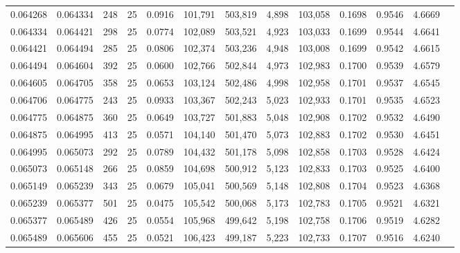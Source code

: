 \begin{tabular}{rrrrrrrrrrrrr}
0.064268 & 0.064334 &   248 &  25 &                                     0.0916 & 101,791 & 503,819 &   4,898 & 103,058 & 0.1698 & 0.9546 & 4.6669 \\
0.064334 & 0.064421 &   298 &  25 &                                     0.0774 & 102,089 & 503,521 &   4,923 & 103,033 & 0.1699 & 0.9544 & 4.6641 \\
0.064421 & 0.064494 &   285 &  25 &                                     0.0806 & 102,374 & 503,236 &   4,948 & 103,008 & 0.1699 & 0.9542 & 4.6615 \\
0.064494 & 0.064604 &   392 &  25 &                                     0.0600 & 102,766 & 502,844 &   4,973 & 102,983 & 0.1700 & 0.9539 & 4.6579 \\
0.064605 & 0.064705 &   358 &  25 &                                     0.0653 & 103,124 & 502,486 &   4,998 & 102,958 & 0.1701 & 0.9537 & 4.6545 \\
0.064706 & 0.064775 &   243 &  25 &                                     0.0933 & 103,367 & 502,243 &   5,023 & 102,933 & 0.1701 & 0.9535 & 4.6523 \\
0.064775 & 0.064875 &   360 &  25 &                                     0.0649 & 103,727 & 501,883 &   5,048 & 102,908 & 0.1702 & 0.9532 & 4.6490 \\
0.064875 & 0.064995 &   413 &  25 &                                     0.0571 & 104,140 & 501,470 &   5,073 & 102,883 & 0.1702 & 0.9530 & 4.6451 \\
0.064995 & 0.065073 &   292 &  25 &                                     0.0789 & 104,432 & 501,178 &   5,098 & 102,858 & 0.1703 & 0.9528 & 4.6424 \\
0.065073 & 0.065148 &   266 &  25 &                                     0.0859 & 104,698 & 500,912 &   5,123 & 102,833 & 0.1703 & 0.9525 & 4.6400 \\
0.065149 & 0.065239 &   343 &  25 &                                     0.0679 & 105,041 & 500,569 &   5,148 & 102,808 & 0.1704 & 0.9523 & 4.6368 \\
0.065239 & 0.065377 &   501 &  25 &                                     0.0475 & 105,542 & 500,068 &   5,173 & 102,783 & 0.1705 & 0.9521 & 4.6321 \\
0.065377 & 0.065489 &   426 &  25 &                                     0.0554 & 105,968 & 499,642 &   5,198 & 102,758 & 0.1706 & 0.9519 & 4.6282 \\
0.065489 & 0.065606 &   455 &  25 &                                     0.0521 & 106,423 & 499,187 &   5,223 & 102,733 & 0.1707 & 0.9516 & 4.6240 \\

\end{tabular}
